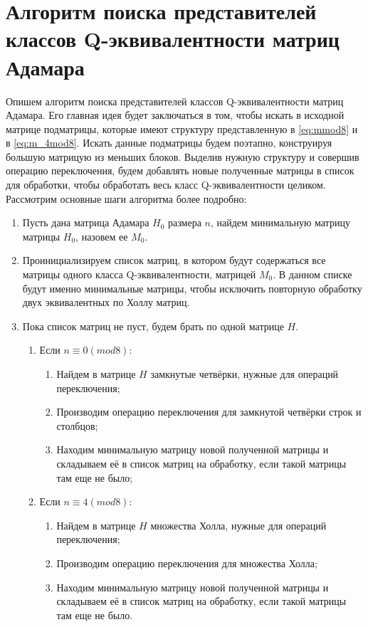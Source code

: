 \section{Алгоритм поиска представителей классов Q-эквивалентности матриц Адамара}

Опишем алгоритм поиска представителей классов Q-эквивалентности матриц Адамара. Его главная идея будет заключаться в том, чтобы искать в исходной матрице подматрицы, которые имеют структуру представленную в \ref{eq:mmod8} и в \ref{eq:m_4mod8}. Искать данные подматрицы будем поэтапно, конструируя большую матрицую из меньших блоков. Выделив нужную структуру и совершив операцию переключения, будем добавлять новые полученные матрицы в список для обработки, чтобы обработать весь класс Q-эквивалентности целиком. Рассмотрим основные шаги алгоритма более подробно:
\begin{enumerate}
    \item Пусть дана матрица Адамара $H_0$ размера $n$, найдем минимальную матрицу матрицы $H_0$, назовем ее $M_0$.
    \item Проинициализируем список матриц, в котором будут содержаться все матрицы одного класса Q-эквивалентности, матрицей $M_0$. В данном списке будут именно минимальные матрицы, чтобы исключить повторную обработку двух эквивалентных по Холлу матриц.
    \item Пока список матриц не пуст, будем брать по одной матрице $H$.
    \begin{enumerate}
        \item Если $n \equiv 0(mod8)$:
        \begin{enumerate}
            \item Найдем в матрице $H$ замкнутые четвёрки, нужные для операций переключения;
            \item Производим операцию переключения для замкнутой четвёрки строк и столбцов;
            \item Находим минимальную матрицу новой полученной матрицы и складываем её в список матриц на обработку, если такой матрицы там еще не было;
        \end{enumerate}
        \item Если $n \equiv 4(mod8)$:
        \begin{enumerate}
            \item Найдем в матрице $H$ множества Холла, нужные для операций переключения;
            \item Производим операцию переключения для множества Холла;
            \item Находим минимальную матрицу новой полученной матрицы и складываем её в список матриц на обработку, если такой матрицы там еще не было.
        \end{enumerate}
    \end{enumerate}
\end{enumerate}


